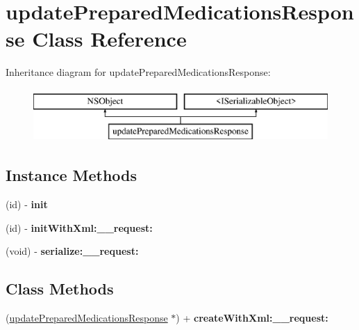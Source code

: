 \hypertarget{interfaceupdate_prepared_medications_response}{}\section{update\+Prepared\+Medications\+Response Class Reference}
\label{interfaceupdate_prepared_medications_response}
Inheritance diagram for update\+Prepared\+Medications\+Response\+:\begin{figure}[H]
\begin{center}
\leavevmode
\includegraphics[height=2.000000cm]{interfaceupdate_prepared_medications_response}
\end{center}
\end{figure}
\subsection*{Instance Methods}
\begin{DoxyCompactItemize}
\item 
\hypertarget{interfaceupdate_prepared_medications_response_ac0c8eae7c4d3ccf096b192faab7f35d4}{}(id) -\/ {\bfseries init}\label{interfaceupdate_prepared_medications_response_ac0c8eae7c4d3ccf096b192faab7f35d4}

\item 
\hypertarget{interfaceupdate_prepared_medications_response_a3758274d7daa6161fc1b34283747b644}{}(id) -\/ {\bfseries init\+With\+Xml\+:\+\_\+\+\_\+request\+:}\label{interfaceupdate_prepared_medications_response_a3758274d7daa6161fc1b34283747b644}

\item 
\hypertarget{interfaceupdate_prepared_medications_response_aeb963ba71cb39cd1bdccde63d78b67ae}{}(void) -\/ {\bfseries serialize\+:\+\_\+\+\_\+request\+:}\label{interfaceupdate_prepared_medications_response_aeb963ba71cb39cd1bdccde63d78b67ae}

\end{DoxyCompactItemize}
\subsection*{Class Methods}
\begin{DoxyCompactItemize}
\item 
\hypertarget{interfaceupdate_prepared_medications_response_aca0f878447ebb597ff60c15b208c5bca}{}(\hyperlink{interfaceupdate_prepared_medications_response}{update\+Prepared\+Medications\+Response} $\ast$) + {\bfseries create\+With\+Xml\+:\+\_\+\+\_\+request\+:}\label{interfaceupdate_prepared_medications_response_aca0f878447ebb597ff60c15b208c5bca}

\end{DoxyCompactItemize}
